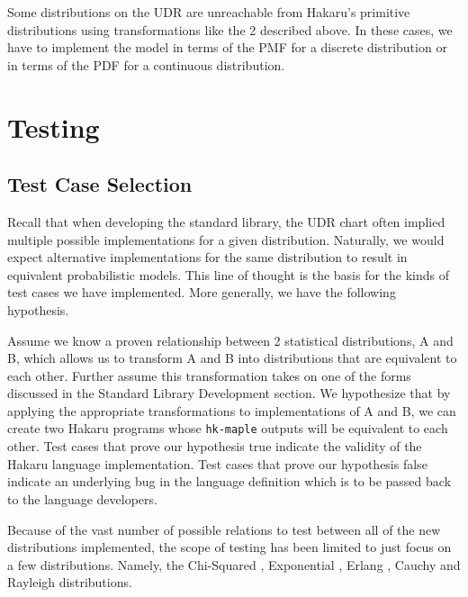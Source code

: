 \documentclass[11pt]{article}
\begin{document}
Some distributions on the UDR are unreachable from Hakaru's primitive distributions using transformations like the 2 described above. In these cases, we have to implement the model in terms of the PMF for a discrete distribution or in terms of the PDF for a continuous distribution.



\section{Testing}

\subsection{Test Case Selection}

\justifying

Recall that when developing the standard library, the UDR chart often implied multiple possible implementations for a given distribution. Naturally, we would expect alternative implementations for the same distribution to result in equivalent probabilistic models. This line of thought is the basis for the kinds of test cases we have implemented. More generally, we have the following hypothesis.

Assume we know a proven relationship between 2 statistical distributions, A and B, which allows us to transform A and B into distributions that are equivalent to each other. Further assume this transformation takes on one of the forms discussed in the Standard Library Development section. We hypothesize that by applying the appropriate transformations to implementations of A and B, we can create two Hakaru programs whose {\tt hk-maple} outputs will be equivalent to each other. Test cases that prove our hypothesis true indicate the validity of the Hakaru language implementation. Test cases that prove our hypothesis false indicate an underlying bug in the language definition which is to be passed back to the language developers.

Because of the vast number of possible relations to test between all of the new distributions implemented, the scope of testing has been limited to just focus on a few distributions. Namely, the Chi-Squared \cite{chi}, Exponential \cite{expo}, Erlang \cite{erlang}, Cauchy \cite{cauchy} and Rayleigh \cite{rayleigh} distributions.
\end{document}
